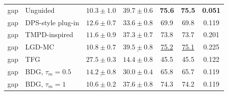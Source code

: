 \documentclass{article}
\begin{document}
\begin{table}[!htbp]
\begin{tabular}{llccccc}
\midrule
gap & Unguided & $10.3\pm1.0$ & $\mathbf{39.7\pm0.6}$& \textbf{75.6}& \textbf{75.5}& \textbf{0.051}\\
gap & DPS-style plug-in & $12.6\pm0.7$ & $33.6\pm0.8$ & 69.9 & 69.8 & 0.119\\
gap & TMPD-inspired & $11.6\pm0.9$ & $37.3\pm0.7$ & 73.8 & 73.7 & 0.201\\
gap & LGD-MC & $10.8\pm0.7$ & $\underline{39.5\pm0.8}$& \underline{75.2}& \underline{75.1}& 0.225\\
gap & TFG & $\mathbf{27.5\pm0.3}$& $14.4\pm0.8$ & 45.5 & 45.5 & 0.122\\
gap & BDG, $\tau_m=0.5$ & $\underline{14.2\pm0.8}$& $30.0\pm0.4$ & 65.8 & 65.7 & 0.119\\
gap & BDG, $\tau_m=1$ & $10.6\pm0.2$ & $37.6\pm0.8$ & 74.3 & 74.2 & 0.119\\
\bottomrule
\end{tabular}
\end{table}
\clearpage
\end{document}
